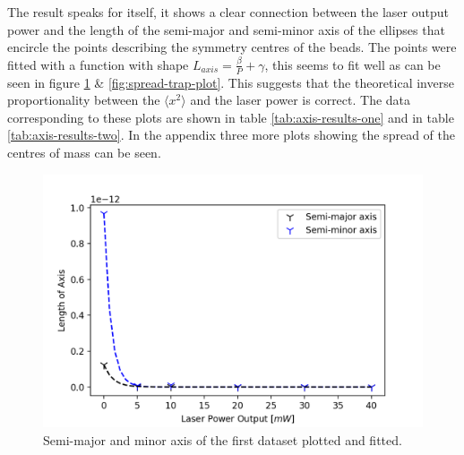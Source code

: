 The result speaks for itself, it shows a clear connection between the laser output power and the length of the semi-major and semi-minor axis of the ellipses that encircle the points describing the symmetry centres of the beads. The points were fitted with a function with shape $L_{axis}=\frac{\beta}{P}+\gamma$, this seems to fit well as can be seen in figure \ref{fig:spread-bead-plot} \& \ref{fig:spread-trap-plot}. This suggests that the theoretical inverse proportionality between the $\langle x^2 \rangle$ and the laser power is correct. The data corresponding to these plots are shown in table \ref{tab:axis-results-one} and in table \ref{tab:axis-results-two}. In the appendix three more plots showing the spread of the centres of mass can be seen.

\begin{minipage}{\linewidth}
    \centering
    \begin{minipage}[l]{0.45\linewidth}
        \begin{figure}[H]
            \centering
            \includegraphics[width=\linewidth]{figures/axis-dataset2.png}
            \caption{Semi-major and minor axis of the first dataset plotted and fitted.\\}
            \label{fig:spread-bead-plot}
        \end{figure}
    \end{minipage}
    \hspace{0.05\linewidth}
    \begin{minipage}[r]{0.45\linewidth}
        \begin{figure}[H]
            \centering

\end{figure}
\end{minipage}
\end{minipage}

